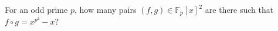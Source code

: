 For an odd prime $p$, how many pairs $\left(f,g\right)\in\mathbb{F}_p\left[x\right]^2$ are there such that $f\circ g=x^{p^2}-x$?